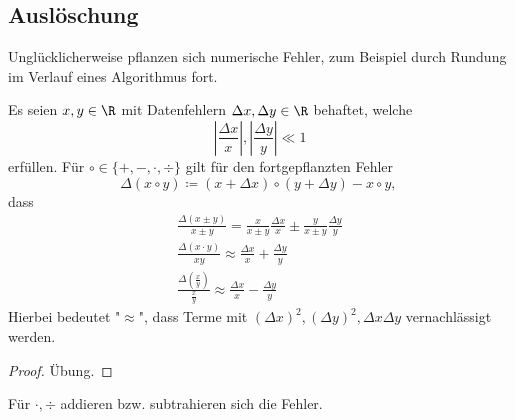 \subsection{Auslöschung}
Unglücklicherweise pflanzen sich numerische Fehler, zum Beispiel durch Rundung im Verlauf eines Algorithmus fort.

\begin{lemma}[Fehlerfortpflanzung]
Es seien $x,y \in \R$ mit Datenfehlern $\Delta x, \Delta y \in  \R$ behaftet, welche\[
\left| \frac{\Delta x}{x} \right| , \left|\frac{\Delta y}{y} \right| \ll 1
\]
erfüllen. Für $\circ \in  \{+,-,\cdot, \div\}$ gilt für den fortgepflanzten Fehler
\[
\Delta (x \circ y) \coloneqq (x+ \Delta x) \circ (y + \Delta y) - x \circ y \text{, }
\]
dass
\begin{equation*}
\begin{split}
\frac{\Delta (x \pm y)}{x \pm y} = \frac{x}{x \pm y}\frac{\Delta x}{x} \pm \frac{y}{x \pm y} \frac{\Delta y}{y} \\
\frac{\Delta (x \cdot y)}{xy} \approx \frac{\Delta x}{x}+ \frac{\Delta y}{y} \\
\frac{\Delta (\frac{x}{y})}{\frac{x}{y}} \approx \frac{\Delta x}{x}-\frac{\Delta y}{y}
\end{split}
\end{equation*}
Hierbei bedeutet "$\approx$", dass Terme mit $(\Delta x)^2, (\Delta y)^2, \Delta x \Delta y$ vernachlässigt werden.
\end{lemma}
\begin{proof}
Übung.
\end{proof}
Für $\cdot,\div$ addieren bzw. subtrahieren sich die Fehler.
